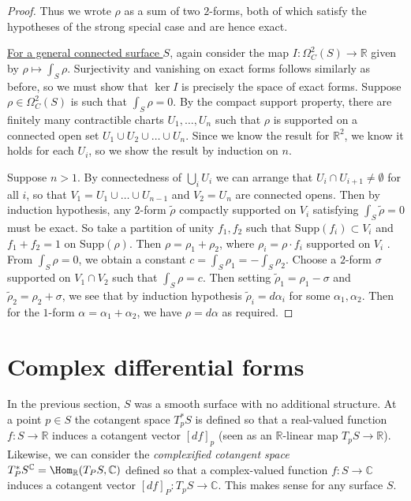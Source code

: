 \begin{theorem}
\begin{proof}
        Thus we wrote \(\rho\) as a sum of two \(2\)-forms, both of which
        satisfy the hypotheses of the strong special case and are hence exact.

        \underline{For a general connected surface \(S\)}, again consider the
        map \(I:\Omega^2_C(S)\to \mathbb{R}\) given by \(\rho \mapsto
        \int_S\rho\).  Surjectivity and vanishing on exact forms follows
        similarly as before, so we must show that \(\ker I\) is precisely the
        space of exact forms. Suppose \(\rho\in \Omega^2_C(S)\) is such that
        \(\int_S \rho =0\). By the compact support property, there are finitely
        many contractible charts \(U_1,\ldots,U_n\) such that \(\rho\) is supported
        on a connected open set \(U_1\cup U_2\cup \ldots \cup U_n\). Since
        we know the result for \(\mathbb{R}^2\), we know it holds for each
        \(U_i\), so we show the result by induction on \(n\).

        Suppose \(n>1\). By connectedness of \(\bigcup_i U_i\) we can arrange
        that \(U_i\cap U_{i+1}\neq \emptyset\) for all \(i\), so that
        \(V_1=U_1\cup \ldots\cup U_{n-1}\) and \(V_2=U_n\) are connected opens.
        Then by induction hypothesis, any \(2\)-form \(\tilde\rho\) compactly
        supported on \(V_i\) satisfying \(\int_S\tilde\rho=0\) must be exact. So
        take a partition of unity \(f_1,f_2\) such that
        \(\text{Supp}(f_i)\subset V_i\) and \(f_1+f_2=1\) on
        \(\text{Supp}(\rho)\). Then \(\rho = \rho_1 +\rho_2\), where
        \(\rho_i=\rho\cdot f_i\) supported on \(V_i\) . From \(\int_S\rho=0\),
        we obtain a constant \(c=\int_S \rho_1=-\int_S\rho_2\). Choose a
        \(2\)-form \(\sigma\) supported on \(V_1\cap V_2\) such that
        \(\int_S\rho = c\). Then setting \(\tilde\rho_1=\rho_1-\sigma\) and
        \(\tilde\rho_2=\rho_2+\sigma\), we see that by induction hypothesis
        \(\tilde\rho_i=d\alpha_i\) for some \(\alpha_1,\alpha_2\). Then for the
        \(1\)-form \(\alpha=\alpha_1+\alpha_2\), we have \(\rho=d\alpha\) as
        required.
    \end{proof}
\end{theorem}

\section{Complex differential forms}
In the previous section, \(S\) was a smooth surface with no additional
structure. At a point \(p\in S\) the cotangent space \(T_p^\ast S\) is defined so that a real-valued function \(f:S\to \mathbb{R}\) induces a cotangent vector \([df]_p\) (seen as an \(\mathbb{R}\)-linear map \(T_pS\to \mathbb{R}\)). Likewise, we can consider the \textit{complexified cotangent space} \(T_P^\ast
S^\mathbb{C}=\Hom_\mathbb{R}(T_PS,\mathbb{C})\) defined so that a complex-valued
function \(f:S\to \mathbb{C}\) induces a cotangent vector \([df]_P:T_pS\to \mathbb{C}\). This makes sense for any surface \(S\).

